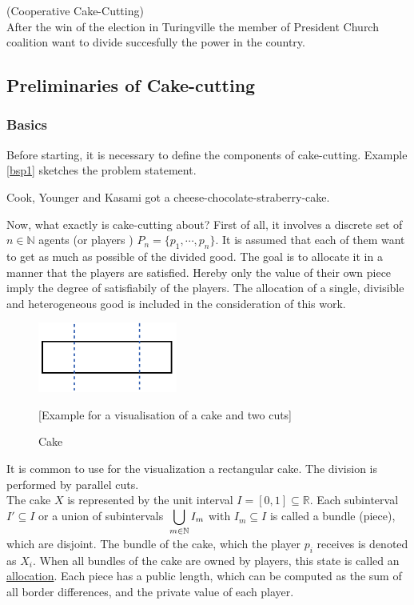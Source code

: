 \begin{bsp}
\label{bsp2}
(Cooperative Cake-Cutting)\\
After the win of the election in Turingville the member of President Church coalition want to divide succesfully the power in the country. 
\end{bsp}
\newpage
\subsection{Preliminaries of Cake-cutting}
\subsubsection{Basics}
Before starting, it is necessary to define the components of cake-cutting. Example \ref{bsp1} sketches the problem statement.\\
%
\begin{bsp}
\label{bsp1}
Cook, Younger and Kasami got a cheese-chocolate-straberry-cake. 
\end{bsp}
%
Now, what exactly is cake-cutting about? First of all, it involves a discrete set of $n \in \mathbb{N}$ agents (or players ) $P_n=\{p_1,\cdots,p_n\}$. It is assumed that each of them want to get as much as possible of the divided good. The goal is to allocate it in a manner that the players are satisfied. Hereby only the value of their own piece imply the degree of satisfiabily of the players. The allocation of a single, divisible and heterogeneous good is included in the consideration of this work.\\ 
	\begin{figure}[h]
		\centering
 		 \includegraphics[width=130pt]{kek.pdf}
   \caption{Cake}[Example for a visualisation of a cake and two cuts]
  	 \end{figure}
It is common to use for the visualization a rectangular cake. The division is performed by parallel cuts.\\ The cake $X$ is represented by the unit interval $I=[0,1] \subseteq \mathbb{R}$. Each subinterval $I'\subseteq I$ or a union of subintervals $\sideset{}{ }\bigcup\limits_{m\in\mathbb{N}}I_m$ 
with $I_m\subseteq I$ is called a bundle (piece), which are disjoint. The bundle of the cake, which the player $p_i$ receives is denoted as $X_i$. When all bundles of the cake are owned by players, this state is called an \underline{allocation}. Each piece has a public length, which can be computed as the sum of all border differences, and the private value of each player.\\

